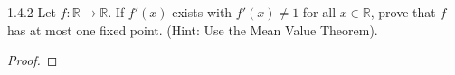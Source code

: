 \begin{problem}{1.4.2}
  Let $f : \mathbb{R} \to \mathbb{R}$. If $f'(x)$ exists with $f'(x) \neq 1$ for
  all $x \in \mathbb{R}$, prove that $f$ has at most one fixed point.
  (Hint: Use the Mean Value Theorem).
\end{problem}

\begin{proof}
\end{proof}
\newpage
